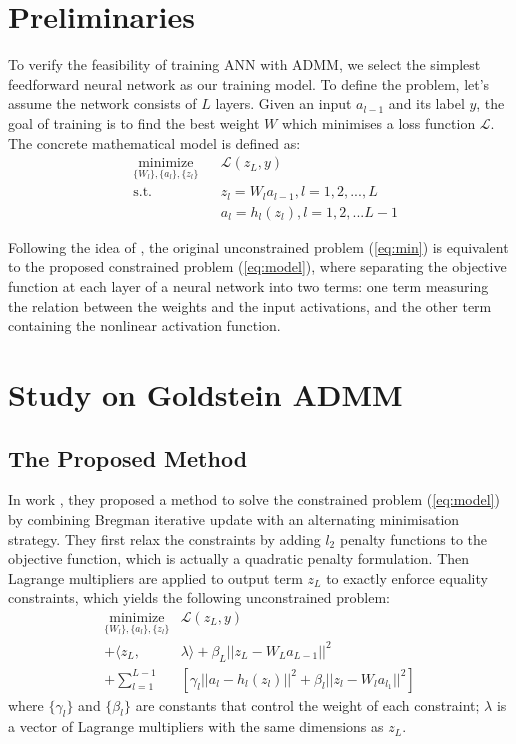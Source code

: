 \documentclass[letterpaper, 10 pt, conference]{ieeeconf}  %
\begin{document}
\section{Preliminaries}\label{preliminaries}
To verify the feasibility of training ANN with ADMM, we select the simplest feedforward neural network as our training model. To define the problem, let's assume the network consists of $L$ layers. Given an input $a_{l-1}$ and its label $y$, the goal of training is to find the best weight $W$ which minimises a loss function $\mathcal{L}$. The concrete mathematical model is defined as: 
\begin{equation}
\begin{aligned} 
& \underset{\{W_l\},\{a_l\}, \{z_l\}}{\text{minimize}}
& & \mathcal{L}(z_L,y) \\
& \text{s.t.}
& & z_l = W_la_{l-1},  l = 1,2,...,L \\
& & & a_l = h_l(z_l),  l = 1,2,...L-1 \label{eq:model}
\end{aligned}
\end{equation}

Following the idea of \cite{9}, the original unconstrained problem (\ref{eq:min}) is equivalent to the proposed constrained problem (\ref{eq:model}), where separating the objective function at each layer of a neural network into two terms: one term measuring the relation between the weights and the input activations, and the other term containing the nonlinear activation function. 



\section{Study on Goldstein ADMM} \label{studycase}
\subsection{The Proposed Method} \label{method}
In work \cite{9}, they proposed a method to solve the constrained problem (\ref{eq:model}) by combining Bregman iterative update with an alternating minimisation strategy. They first relax the constraints by adding $l_2$ penalty functions to the objective function, which is actually a quadratic penalty formulation. Then  Lagrange multipliers are applied to output term $z_L$ to exactly enforce equality constraints, which yields the following unconstrained problem: \\
\begin{equation}
\begin{aligned}
\underset{\{W_l\},\{a_l\}, \{z_l\}}{\text{minimize}} & \mathcal{L}(z_L,y) \\
+  \langle z_L, &\lambda \rangle + \beta_L||z_L -W_La_{L-1}||^2 \\
+ \sum_{l=1}^{L-1}&[\gamma_l||a_l - h_l(z_l)||^2 + \beta_l||z_l - W_la_{l_1}||^2]
\label{eq:breg_model}
\end{aligned}
\end{equation}
where $\{\gamma_l \}$ and $\{\beta_l\}$ are constants that control the weight of each constraint; $\lambda$ is a vector of Lagrange multipliers with the same dimensions as $z_L$. 
\end{document}
